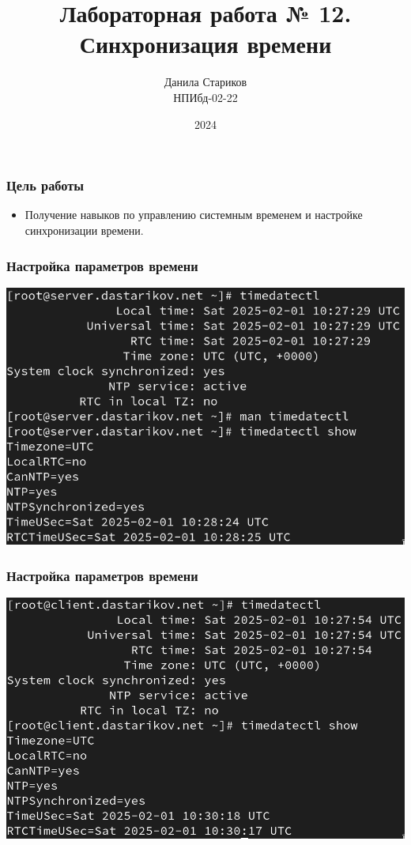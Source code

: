 

\title{Лабораторная работа № 12. \\Синхронизация времени}
\author{Данила Стариков \\ НПИбд-02-22}
\date{2024}



\frame{\titlepage}

\begin{frame}
  \frametitle{Цель работы}
  \begin{itemize}
  \item Получение навыков по управлению системным временем и настройке синхронизации времени.
  \end{itemize}
\end{frame}

\begin{frame}
  \frametitle{Настройка параметров времени}
  \centering
  \includegraphics[width=\textwidth]{../images/image01.png}
\end{frame}

\begin{frame}
  \frametitle{Настройка параметров времени}
  \centering
  \includegraphics[width=\textwidth]{../images/image02.png}
\end{frame}

